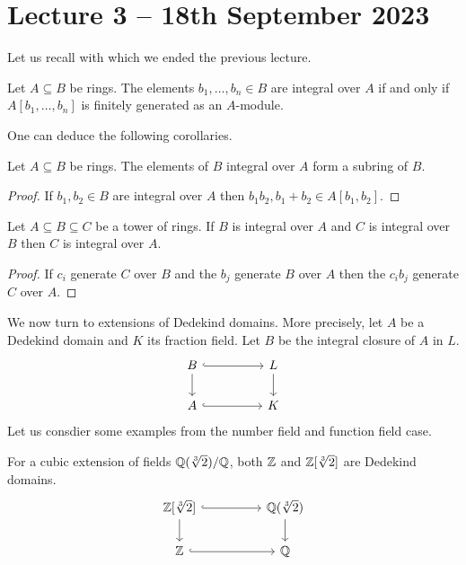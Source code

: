 \section{Lecture 3 -- 18th September 2023}
Let us recall  with which we ended the previous lecture. 
\begin{proposition}[=\Cref{prop:integral over iff finite generation as a module}]
  Let $A\subseteq B$ be rings. The elements $b_{1},\dots,b_{n}\in B$ are integral over $A$ if and only if $A[b_{1},\dots,b_{n}]$ is finitely generated as an $A$-module. 
\end{proposition}
One can deduce the following corollaries. 
\begin{corollary}\label{corr: integral elements are subring}
  Let $A\subseteq B$ be rings. The elements of $B$ integral over $A$ form a subring of $B$. 
\end{corollary}
\begin{proof}
  If $b_{1},b_{2}\in B$ are integral over $A$ then $b_{1}b_{2}, b_{1}+b_{2}\in A[b_{1},b_{2}]$. 
\end{proof}
\begin{corollary}
  Let $A\subseteq B\subseteq C$ be a tower of rings. If $B$ is integral over $A$ and $C$ is integral over $B$ then $C$ is integral over $A$. 
\end{corollary}
\begin{proof}
  If $c_{i}$ generate $C$ over $B$ and the $b_{j}$ generate $B$ over $A$ then the $c_{i}b_{j}$ generate $C$ over $A$. 
\end{proof}
We now turn to extensions of Dedekind domains. More precisely, let $A$ be a Dedekind domain and $K$ its fraction field. Let $B$ be the integral closure of $A$ in $L$. 
$$%
\begin{tikzcd}
	B && L \\
	A && K
	\arrow[hook, from=2-1, to=2-3]
	\arrow[hook, from=1-1, to=1-3]
	\arrow[from=1-1, to=2-1]
	\arrow[from=1-3, to=2-3]
\end{tikzcd}$$
Let us consdier some examples from the number field and function field case. 
\begin{example}
  For a cubic extension of fields $\mathbb{Q}(\sqrt[3]{2})/\mathbb{Q}$, both $\mathbb{Z}$ and $\mathbb{Z}[\sqrt[3]{2}]$ are Dedekind domains. 
  $$%
  \begin{tikzcd}
    {\ZZ[\sqrt[3]{2}]} && {\QQ(\sqrt[3]{2})} \\
    \ZZ && \QQ
    \arrow[hook, from=2-1, to=2-3]
    \arrow[hook, from=1-1, to=1-3]
    \arrow[from=1-1, to=2-1]
    \arrow[from=1-3, to=2-3]
  \end{tikzcd}$$
\end{example}

